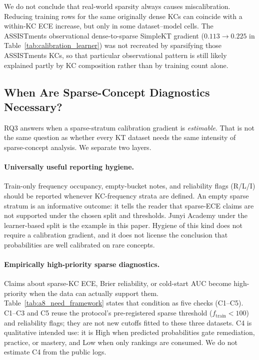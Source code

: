 We do not conclude that real-world sparsity always causes miscalibration. Reducing training rows for the same originally dense KCs can coincide with a within-KC ECE increase, but only in some dataset--model cells. The ASSISTments observational dense-to-sparse SimpleKT gradient ($0.113\to 0.225$ in Table~\ref{tab:calibration_learner}) was not recreated by sparsifying those ASSISTments KCs, so that particular observational pattern is still likely explained partly by KC composition rather than by training count alone.

\subsection{When Are Sparse-Concept Diagnostics Necessary?}
\label{sec:a8_when_needed}

RQ3 answers when a sparse-stratum calibration gradient is \emph{estimable}. That is not the same question as whether every KT dataset needs the same intensity of sparse-concept analysis. We separate two layers.

\paragraph{Universally useful reporting hygiene.}
Train-only frequency occupancy, empty-bucket notes, and reliability flags (R/L/I) should be reported whenever KC-frequency strata are defined. An empty sparse stratum is an informative outcome: it tells the reader that sparse-ECE claims are not supported under the chosen split and thresholds. Junyi Academy under the learner-based split is the example in this paper. Hygiene of this kind does not require a calibration gradient, and it does not license the conclusion that probabilities are well calibrated on rare concepts.

\paragraph{Empirically high-priority sparse diagnostics.}
Claims about sparse-KC ECE, Brier reliability, or cold-start AUC become high-priority when the data can actually support them. Table~\ref{tab:a8_need_framework} states that condition as five checks (C1--C5). C1--C3 and C5 reuse the protocol's pre-registered sparse threshold ($f_{\mathrm{train}}<100$) and reliability flags; they are not new cutoffs fitted to these three datasets. C4 is qualitative intended use: it is High when predicted probabilities gate remediation, practice, or mastery, and Low when only rankings are consumed. We do not estimate C4 from the public logs.

